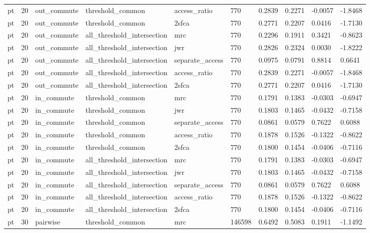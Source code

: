 \begin{table}[htbp]
\begin{tabular}{llllllllll}
pt & 20 & out\_commute & threshold\_common & access\_ratio & 770 & 0.2839 & 0.2271 & -0.0057 & -1.8468 \\
pt & 20 & out\_commute & threshold\_common & 2sfca & 770 & 0.2771 & 0.2207 & 0.0416 & -1.7130 \\
pt & 20 & out\_commute & all\_threshold\_intersection & mrc & 770 & 0.2296 & 0.1911 & 0.3421 & -0.8623 \\
pt & 20 & out\_commute & all\_threshold\_intersection & jwr & 770 & 0.2826 & 0.2324 & 0.0030 & -1.8222 \\
pt & 20 & out\_commute & all\_threshold\_intersection & separate\_access & 770 & 0.0975 & 0.0791 & 0.8814 & 0.6641 \\
pt & 20 & out\_commute & all\_threshold\_intersection & access\_ratio & 770 & 0.2839 & 0.2271 & -0.0057 & -1.8468 \\
pt & 20 & out\_commute & all\_threshold\_intersection & 2sfca & 770 & 0.2771 & 0.2207 & 0.0416 & -1.7130 \\
pt & 20 & in\_commute & threshold\_common & mrc & 770 & 0.1791 & 0.1383 & -0.0303 & -0.6947 \\
pt & 20 & in\_commute & threshold\_common & jwr & 770 & 0.1803 & 0.1465 & -0.0432 & -0.7158 \\
pt & 20 & in\_commute & threshold\_common & separate\_access & 770 & 0.0861 & 0.0579 & 0.7622 & 0.6088 \\
pt & 20 & in\_commute & threshold\_common & access\_ratio & 770 & 0.1878 & 0.1526 & -0.1322 & -0.8622 \\
pt & 20 & in\_commute & threshold\_common & 2sfca & 770 & 0.1800 & 0.1454 & -0.0406 & -0.7116 \\
pt & 20 & in\_commute & all\_threshold\_intersection & mrc & 770 & 0.1791 & 0.1383 & -0.0303 & -0.6947 \\
pt & 20 & in\_commute & all\_threshold\_intersection & jwr & 770 & 0.1803 & 0.1465 & -0.0432 & -0.7158 \\
pt & 20 & in\_commute & all\_threshold\_intersection & separate\_access & 770 & 0.0861 & 0.0579 & 0.7622 & 0.6088 \\
pt & 20 & in\_commute & all\_threshold\_intersection & access\_ratio & 770 & 0.1878 & 0.1526 & -0.1322 & -0.8622 \\
pt & 20 & in\_commute & all\_threshold\_intersection & 2sfca & 770 & 0.1800 & 0.1454 & -0.0406 & -0.7116 \\
pt & 30 & pairwise & threshold\_common & mrc & 146598 & 0.6492 & 0.5083 & 0.1911 & -1.1492 \\

\end{tabular}
\end{table}
